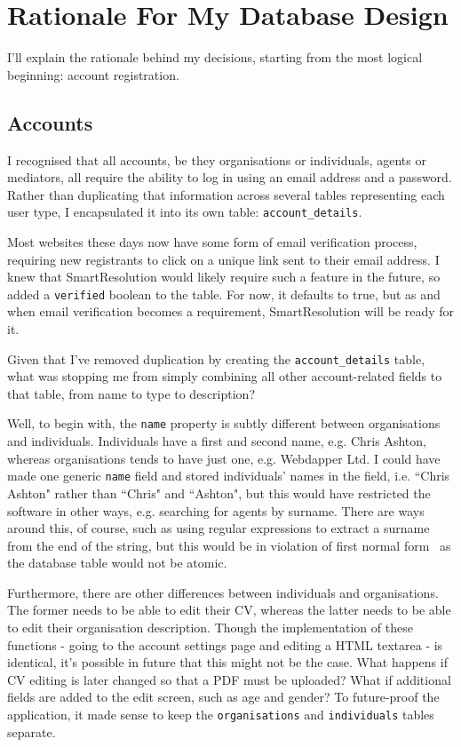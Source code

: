 \chapter{Rationale For My Database Design} \label{appendix:database}

I'll explain the rationale behind my decisions, starting from the most logical beginning: account registration.

\section{Accounts}

I recognised that all accounts, be they organisations or individuals, agents or mediators, all require the ability to log in using an email address and a password. Rather than duplicating that information across several tables representing each user type, I encapsulated it into its own table: \lstinline{account_details}.

Most websites these days now have some form of email verification process, requiring new registrants to click on a unique link sent to their email address. I knew that SmartResolution would likely require such a feature in the future, so added a \lstinline{verified} boolean to the table. For now, it defaults to true, but as and when email verification becomes a requirement, SmartResolution will be ready for it.

Given that I've removed duplication by creating the \lstinline{account_details} table, what was stopping me from simply combining all other account-related fields to that table, from name to type to description?

Well, to begin with, the \lstinline{name} property is subtly different between organisations and individuals. Individuals have a first and second name, e.g. Chris Ashton, whereas organisations tends to have just one, e.g. Webdapper Ltd. I could have made one generic \lstinline{name} field and stored individuals' names in the field, i.e. ``Chris Ashton" rather than ``Chris" and ``Ashton", but this would have restricted the software in other ways, e.g. searching for agents by surname. There are ways around this, of course, such as using regular expressions to extract a surname from the end of the string, but this would be in violation of first normal form~\cite{appendix:firstNormalForm} as the database table would not be atomic.

Furthermore, there are other differences between individuals and organisations. The former needs to be able to edit their CV, whereas the latter needs to be able to edit their organisation description. Though the implementation of these functions - going to the account settings page and editing a HTML textarea - is identical, it's possible in future that this might not be the case. What happens if CV editing is later changed so that a PDF must be uploaded? What if additional fields are added to the edit screen, such as age and gender? To future-proof the application, it made sense to keep the \lstinline{organisations} and \lstinline{individuals} tables separate.

